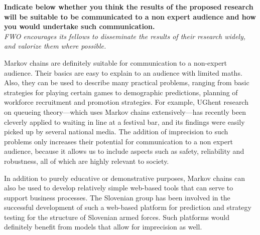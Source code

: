 \documentclass[11pt,dvipsnames,usenames,a4paper]{article}
\begin{document}


\renewcommand\refname{\normalsize Enumerate the bibliographical references that are relevant for your research proposal.}


\vspace{5mm}

\textbf{Indicate below whether you think the results of the proposed research will be suitable to be communicated to a non expert audience and how you would undertake such communication.}\\
\textit{FWO encourages its fellows to disseminate the results of their research widely, and valorize them where possible.}

Markov chains are definitely suitable for communication to a non-expert audience. 
Their basics are easy to explain to an audience with limited maths. 
Also, they can be used to describe many practical problems, ranging from basic strategies for playing certain games to demographic predictions, planning of workforce recruitment and promotion strategies. 
For example, UGhent research on queueing theory---which uses Markov chains extensively---has recently been cleverly applied to waiting in line at a festival bar, and its findings were easily picked up by several national media.
The addition of imprecision to such problems only increases their potential for communication to a non expert audience, because it allows us to include aspects such as safety, reliability and robustness, all of which are highly relevant to society.

In addition to purely educative or demonstrative purposes, Markov chains can also be used to develop relatively simple web-based tools that can serve to support business processes. 
The Slovenian group has been involved in the successful development of such a web-based platform for prediction and strategy testing for the structure of Slovenian armed forces. 
Such platforms would definitely benefit from models that allow for imprecision as well.
\end{document}

